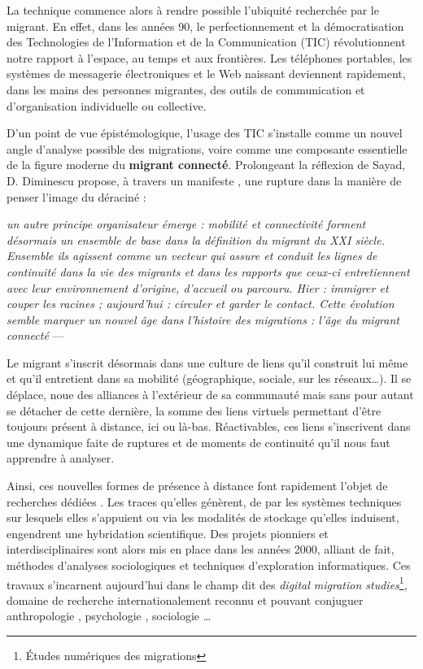 \documentclass[symmetric,justified,marginals=raggedouter]{tufte-book}
\begin{document}
\noindent La technique commence alors à rendre possible l'ubiquité recherchée par le migrant. En effet, dans les années 90, le perfectionnement et la démocratisation des Technologies de l'Information et de la Communication (TIC) révolutionnent notre rapport à l'espace, au temps et aux frontières. Les téléphones portables, les systèmes de messagerie électroniques et le Web naissant deviennent rapidement, dans les mains des personnes migrantes, des outils de communication et d'organisation individuelle ou collective. 

D'un point de vue épistémologique, l'usage des TIC s'installe comme un nouvel angle d'analyse possible des migrations, voire comme une composante essentielle de la figure moderne du \textbf{migrant connecté}. Prolongeant la réflexion de Sayad, D. Diminescu propose, à travers un manifeste \citep{diminescu_connected_2008}, une rupture dans la manière de penser l'image du déraciné :\\

\begin{fullwidth}
\og\textit{un autre principe organisateur émerge : mobilité et connectivité forment désormais un ensemble de base dans la définition du migrant du XXI siècle. Ensemble ils agissent comme un vecteur qui assure et conduit les lignes de continuité dans la vie des migrants et dans les rapports que ceux-ci entretiennent avec leur environnement d’origine, d’accueil ou parcouru. Hier : immigrer et couper les racines ; aujourd’hui : circuler et garder le contact. Cette évolution semble marquer un nouvel âge dans l’histoire des migrations : l’âge du migrant connecté}\fg{} --- \citep[p.3]{diminescu_connected_2008}\\
\end{fullwidth}

\noindent Le migrant s'inscrit désormais dans une culture de liens qu'il construit lui même et qu'il entretient dans sa mobilité (géographique, sociale, sur les réseaux\ldots{}). Il se déplace, noue des alliances à l'extérieur de sa communauté mais sans pour autant se détacher de cette dernière, la somme des liens virtuels permettant d'être toujours présent à distance, ici ou là-bas. Réactivables, ces liens s'inscrivent dans une dynamique faite de ruptures et de moments de continuité qu'il nous faut apprendre à analyser. 

Ainsi, ces nouvelles formes de présence à distance font rapidement l'objet de recherches dédiées \citep{diminescu_les_2002}. Les traces qu'elles génèrent, de par les systèmes techniques sur lesquels elles s'appuient ou via les modalités de stockage qu'elles induisent, engendrent une hybridation scientifique. Des projets pionniers et interdisciplinaires sont alors mis en place dans les années 2000, alliant de fait, méthodes d'analyses sociologiques et techniques d'exploration informatiques. Ces travaux s'incarnent aujourd'hui dans le champ dit des \textit{digital migration studies}\footnote{\RaggedOuter Études numériques des migrations}, domaine de recherche internationalement reconnu \citep{leurs_connected_2018} et pouvant conjuguer anthropologie \citep{zijlstra_smart_2017}, psychologie \citep{chen_internet-usage_2010}, sociologie \citep{damian_social_2014}\ldots{}  
\end{document}
